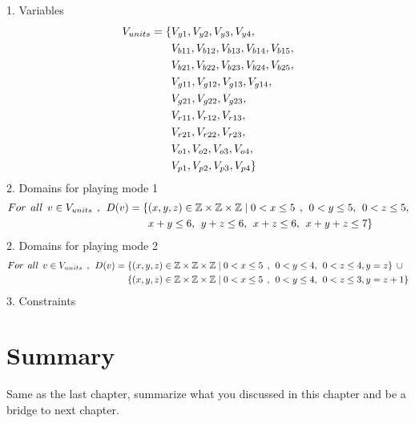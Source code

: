 1. Variables
\begin{align*}
V_{units}=\{&V_{y1},V_{y2},V_{y3},V_{y4},\\&V_{b11},V_{b12},V_{b13},V_{b14},
V_{b15},\\&V_{b21},V_{b22},V_{b23},V_{b24},V_{b25},\\&V_{g11},V_{g12},V_{g13},V_{g14},\\&V_{g21},V_{g22},V_{g23},\\&V_{r11},
V_{r12},V_{r13},\\&V_{r21},V_{r22},V_{r23},\\&V_{o1},V_{o2},V_{o3},V_{o4},\\&V_{p1},V_{p2},V_{p3},V_{p4}\}
\end{align*}
2. Domains for playing mode 1
\begin{align*}
For \hspace{1ex} all \hspace{1ex} v \in V_{units} \hspace{1ex},\hspace{1ex} D(v)=\{&(x,y,z) \in \mathbb{Z} \times \mathbb{Z}	\times \mathbb{Z} \mid  0<x \leq 5 \hspace{1ex} , \hspace{1ex} 0<y \leq 5,\hspace{1ex} 0<z \leq 5,\\& x+y\leq 6,\hspace{1ex} y+z\leq 6,\hspace{1ex}x+z\leq 6,\hspace{1ex}x+y+z\leq 7\}
\end{align*}
2. Domains for playing mode 2
\begin{align*}
For \hspace{1ex} all \hspace{1ex} v \in V_{units} \hspace{1ex},\hspace{1ex} D(v)=\{&(x,y,z) \in \mathbb{Z} \times \mathbb{Z}	\times \mathbb{Z} \mid  0<x \leq 5 \hspace{1ex} , \hspace{1ex} 0<y \leq 4,\hspace{1ex} 0<z \leq 4,y=z\} \hspace{1ex}\cup\\
\{&(x,y,z) \in \mathbb{Z} \times \mathbb{Z}	\times \mathbb{Z} \mid  0<x \leq 5 \hspace{1ex} , \hspace{1ex} 0<y \leq 4,\hspace{1ex} 0<z \leq 3,y=z+1\}
\end{align*}
3. Constraints
\section{Summary}
Same as the last chapter, summarize what you discussed in this chapter and
be a bridge to next chapter.

